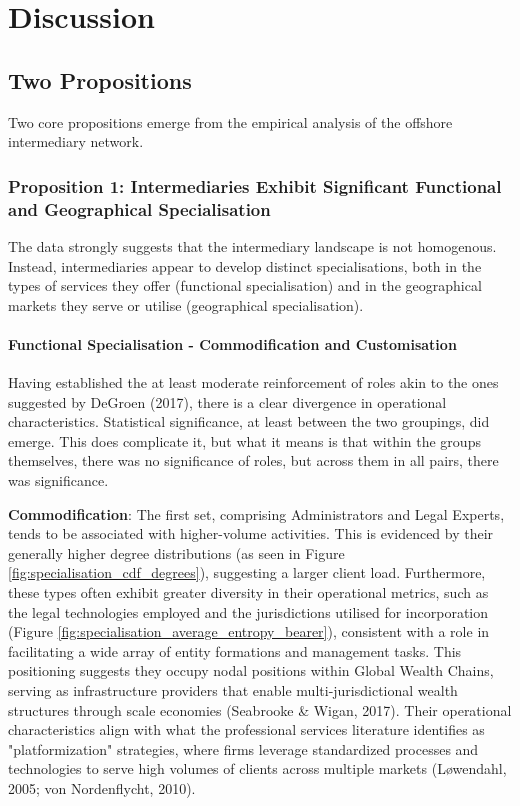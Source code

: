\chapter{Discussion}
\label{chap:discussion}

\section{Two Propositions}
\label{sec:two_propositions}

Two core propositions emerge from the empirical analysis of the offshore intermediary network.

\subsection{Proposition 1: Intermediaries Exhibit Significant Functional and Geographical Specialisation}
\label{subsec:prop1_specialisation}

The data strongly suggests that the intermediary landscape is not homogenous. Instead, intermediaries appear to develop distinct specialisations, both in the types of services they offer (functional specialisation) and in the geographical markets they serve or utilise (geographical specialisation).

\subsubsection*{Functional Specialisation - Commodification and Customisation}

Having established the at least moderate reinforcement of roles akin to the ones suggested by DeGroen (2017), there is a clear divergence in operational characteristics. Statistical significance, at least between the two groupings, did emerge. This does complicate it, but what it means is that within the groups themselves, there was no significance of roles, but across them in all pairs, there was significance.

\textbf{Commodification}: The first set, comprising Administrators and Legal Experts, tends to be associated with higher-volume activities. This is evidenced by their generally higher degree distributions (as seen in Figure \ref{fig:specialisation_cdf_degrees}), suggesting a larger client load. Furthermore, these types often exhibit greater diversity in their operational metrics, such as the legal technologies employed and the jurisdictions utilised for incorporation (Figure \ref{fig:specialisation_average_entropy_bearer}), consistent with a role in facilitating a wide array of entity formations and management tasks. This positioning suggests they occupy nodal positions within Global Wealth Chains, serving as infrastructure providers that enable multi-jurisdictional wealth structures through scale economies (Seabrooke \& Wigan, 2017). Their operational characteristics align with what the professional services literature identifies as "platformization" strategies, where firms leverage standardized processes and technologies to serve high volumes of clients across multiple markets (Løwendahl, 2005; von Nordenflycht, 2010).


